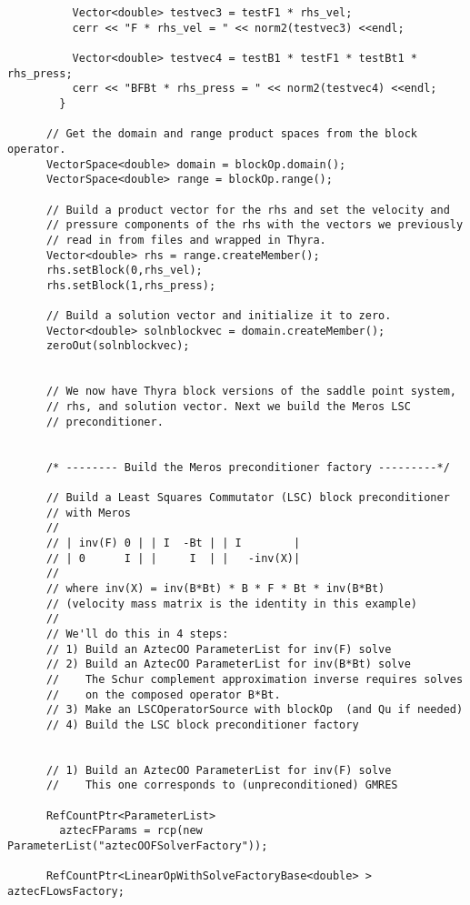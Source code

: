 \documentclass[oneeqnum,onefignum,onetabnum,10pt]{SANDreport}
\begin{document}
\begin{verbatim}
          Vector<double> testvec3 = testF1 * rhs_vel;
          cerr << "F * rhs_vel = " << norm2(testvec3) <<endl;
	  
          Vector<double> testvec4 = testB1 * testF1 * testBt1 * rhs_press;
          cerr << "BFBt * rhs_press = " << norm2(testvec4) <<endl;
        }

      // Get the domain and range product spaces from the block operator. 
      VectorSpace<double> domain = blockOp.domain();
      VectorSpace<double> range = blockOp.range();

      // Build a product vector for the rhs and set the velocity and
      // pressure components of the rhs with the vectors we previously
      // read in from files and wrapped in Thyra.
      Vector<double> rhs = range.createMember();
      rhs.setBlock(0,rhs_vel);
      rhs.setBlock(1,rhs_press);

      // Build a solution vector and initialize it to zero.
      Vector<double> solnblockvec = domain.createMember();
      zeroOut(solnblockvec);


      // We now have Thyra block versions of the saddle point system,
      // rhs, and solution vector. Next we build the Meros LSC
      // preconditioner.


      /* -------- Build the Meros preconditioner factory ---------*/

      // Build a Least Squares Commutator (LSC) block preconditioner
      // with Meros
      // 
      // | inv(F) 0 | | I  -Bt | | I        |
      // | 0      I | |     I  | |   -inv(X)|
      // 
      // where inv(X) = inv(B*Bt) * B * F * Bt * inv(B*Bt)
      // (velocity mass matrix is the identity in this example)
      //
      // We'll do this in 4 steps:
      // 1) Build an AztecOO ParameterList for inv(F) solve
      // 2) Build an AztecOO ParameterList for inv(B*Bt) solve
      //    The Schur complement approximation inverse requires solves
      //    on the composed operator B*Bt.
      // 3) Make an LSCOperatorSource with blockOp  (and Qu if needed)
      // 4) Build the LSC block preconditioner factory 


      // 1) Build an AztecOO ParameterList for inv(F) solve
      //    This one corresponds to (unpreconditioned) GMRES

      RefCountPtr<ParameterList>
        aztecFParams = rcp(new ParameterList("aztecOOFSolverFactory"));

      RefCountPtr<LinearOpWithSolveFactoryBase<double> > aztecFLowsFactory;


\end{verbatim}
\end{document}
